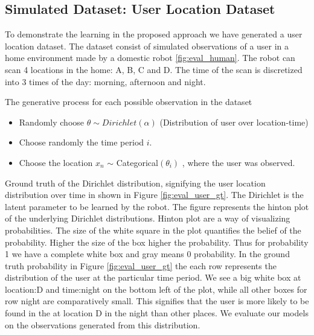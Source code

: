 \subsection{Simulated Dataset: User Location Dataset}

To demonstrate the learning in the proposed approach we have generated a user location dataset. The dataset consist of simulated observations of a user in a home environment made by a domestic robot \ref{fig:eval_human}. The robot can scan 4 locations in the home: A, B, C and D. The time of the scan is discretized into 3 times of the day: morning, afternoon and night. 

The generative process for each possible observation in the dataset 
\begin{itemize}
    \item Randomly choose $ \theta \sim Dirichlet (\alpha)$  (Distribution of user over location-time)
    \item Choose randomly the time period $i$.
	\item Choose the location $x_n$ $\sim$ Categorical$ (\theta_i)$ , where the user was observed.
	\end{itemize}

Ground truth of the Dirichlet distribution, signifying the user location distribution over time in shown in Figure \ref{fig:eval_user_gt}. The Dirichlet is the latent parameter to be learned by the robot.   The figure represents the hinton plot of the underlying Dirichlet distributions. Hinton plot are a way of visualizing probabilities. The size of the white square in the plot quantifies the belief of the probability. Higher the size of the box higher the probability. Thus for probability 1 we have a complete white box and gray means 0 probability. In the ground truth probability in Figure \ref{fig:eval_user_gt} the each row represents the distribution of the user at the particular time period. We see a big white box at location:D and time:night on the bottom left of the plot, while all other boxes for row night are comparatively small. This signifies that the user is more likely to be found in the at location D in the night than other places.  We evaluate our models on the observations generated from this distribution.

